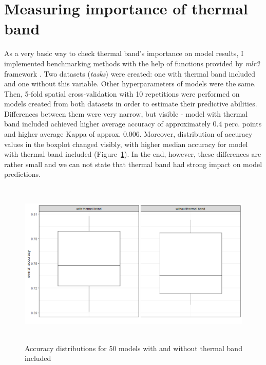 \documentclass{amuthesis}
\begin{document}
\hypertarget{sec-imp-overall}{%
\section{Measuring importance of thermal band}\label{sec-imp-overall}}

As a very basic way to check thermal band's importance on model results,
I implemented benchmarking methods with the help of functions provided
by \emph{mlr3} framework \autocite{R-mlr3}. Two datasets (\emph{tasks})
were created: one with thermal band included and one without this
variable. Other hyperparameters of models were the same. Then, 5-fold
spatial cross-validation with 10 repetitions were performed on models
created from both datasets in order to estimate their predictive
abilities. Differences between them were very narrow, but visible -
model with thermal band included achieved higher average accuracy of
approximately 0.4 perc. points and higher average Kappa of approx.
0.006. Moreover, distribution of accuracy values in the boxplot changed
visibly, with higher median accuracy for model with thermal band
included (Figure~\ref{fig-rycina12}). In the end, however, these
differences are rather small and we can not state that thermal band had
strong impact on model predictions.

\begin{figure}[H]

{\centering \includegraphics[width=5.625in,height=3.125in]{./figures/model_comparison.png}

}

\caption{\label{fig-rycina12}Accuracy distributions for 50 models with
and without thermal band included}

\end{figure}
\end{document}
